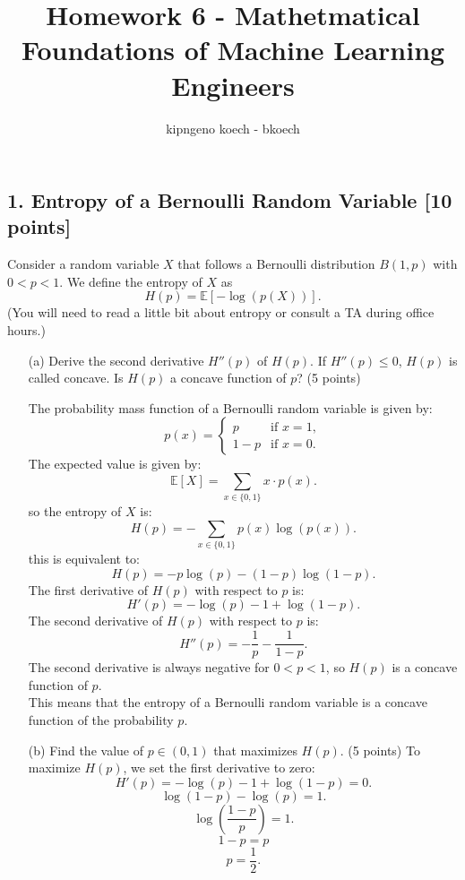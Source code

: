 \documentclass[a3paper,12pt]{article} %
\begin{document}
\author{kipngeno koech - bkoech}
\title{Homework 6 - Mathetmatical Foundations of Machine Learning Engineers}
\maketitle

\medskip


\subsection*{1. Entropy of a Bernoulli Random Variable [10 points] } 

Consider a random variable $X$ that follows a Bernoulli distribution $B(1, p)$ with $0 < p < 1$. We define the entropy of $X$ as 
\[
H(p) = \mathbb{E}[-\log(p(X))].
\]
(You will need to read a little bit about entropy or consult a TA during office hours.)

\begin{enumerate}
    \item[(a)] Derive the second derivative $H''(p)$ of $H(p)$. If $H''(p) \leq 0$, $H(p)$ is called concave. Is $H(p)$ a concave function of $p$? \hfill (5 points)
    
    The probability mass function of a Bernoulli random variable is given by:
    \[
    p(x) = \begin{cases}
    p & \text{if } x = 1, \\
    1 - p & \text{if } x = 0.
    \end{cases}
    \]
    The expected value is given by:
    \[
    \mathbb{E}[X] = \sum_{x \in \{0, 1\}} x \cdot p(x).
    \]
    so the entropy of $X$ is:
    \[
    H(p) = -\sum_{x \in \{0, 1\}} p(x) \log(p(x)).
    \]
    this is equivalent to:
    \[
    H(p) = -p \log(p) - (1 - p) \log(1 - p).
    \]
    The first derivative of $H(p)$ with respect to $p$ is:
    \[
    H'(p) = -\log(p) - 1 + \log(1 - p).
    \]
    The second derivative of $H(p)$ with respect to $p$ is:
    \[
    H''(p) = -\frac{1}{p} - \frac{1}{1 - p}.
    \]
    The second derivative is always negative for $0 < p < 1$, so $H(p)$ is a concave function of $p$.
    \\ This means that the entropy of a Bernoulli random variable is a concave function of the probability $p$.
    \item[(b)] Find the value of $p \in (0, 1)$ that maximizes $H(p)$. \hfill (5 points)
    To maximize $H(p)$, we set the first derivative to zero:
    \[
    H'(p) = -\log(p) - 1 + \log(1 - p) = 0.
    \]
    \[
    \log(1 - p) - \log(p) = 1.
    \]
    \[
    \log\left(\frac{1 - p}{p}\right) = 1.
    \]
    \[
    {1 - p} = p
    \]
    \[
    p = \frac{1}{2}.
    \]
\end{enumerate}
\end{document}
